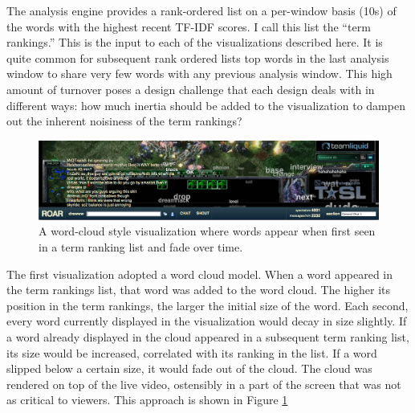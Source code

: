 The analysis engine provides a rank-ordered list on a per-window basis (10s) of the words with the highest recent TF-IDF scores. I call this list the ``term rankings.''  This is the input to each of the visualizations described here. It is quite common for subsequent rank ordered lists top words in the last analysis window to share very few words with any previous analysis window. This high amount of turnover poses a design challenge that each design deals with in different ways: how much inertia should be added to the visualization to dampen out the inherent noisiness of the term rankings? 


\begin{figure}[tb]
	\includegraphics{figures/roar/cloud.png}
	\caption{A word-cloud style visualization where words appear when first seen in a term ranking list and fade over time.}
	\label{fig:pulse_word_cloud}
\end{figure}


The first visualization adopted a word cloud model. When a word appeared in the term rankings list, that word was added to the word cloud. The higher its position in the term rankings, the larger the initial size of the word. Each second, every word currently displayed in the visualization would decay in size slightly. If a word already displayed in the cloud appeared in a subsequent term ranking list, its size would be increased, correlated with its ranking in the list. If a word slipped below a certain size, it would fade out of the cloud. The cloud was rendered on top of the live video, ostensibly in a part of the screen that was not as critical to viewers. This approach is shown in Figure \ref{fig:pulse_word_cloud}

